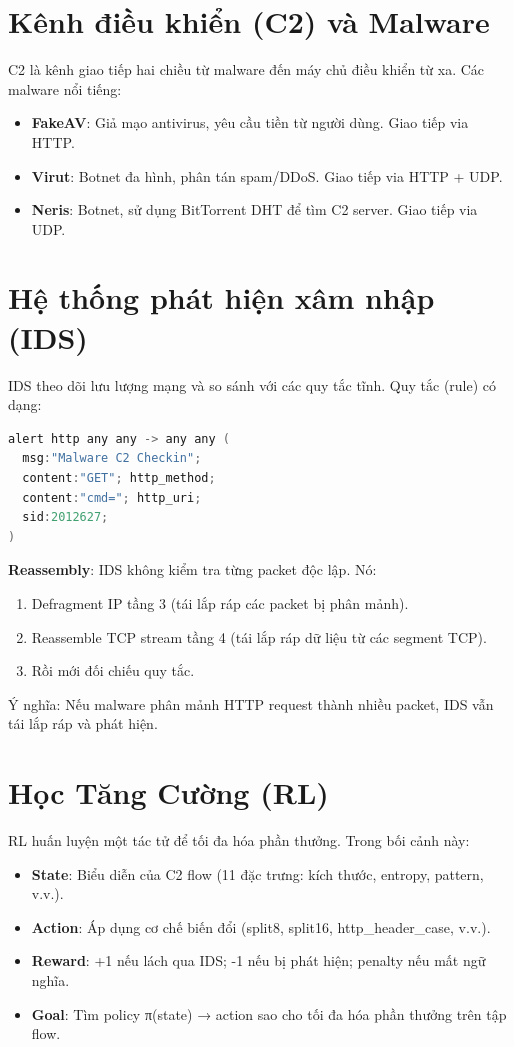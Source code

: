 \documentclass[12pt, a4paper, openany]{book}
\begin{document}
\section{Kênh điều khiển (C2) và Malware}

C2 là kênh giao tiếp hai chiều từ malware đến máy chủ điều khiển từ xa. Các malware nổi tiếng:
\begin{itemize}
    \item \textbf{FakeAV}: Giả mạo antivirus, yêu cầu tiền từ người dùng. Giao tiếp via HTTP.
    \item \textbf{Virut}: Botnet đa hình, phân tán spam/DDoS. Giao tiếp via HTTP + UDP.
    \item \textbf{Neris}: Botnet, sử dụng BitTorrent DHT để tìm C2 server. Giao tiếp via UDP.
\end{itemize}

\section{Hệ thống phát hiện xâm nhập (IDS)}

IDS theo dõi lưu lượng mạng và so sánh với các quy tắc tĩnh. Quy tắc (rule) có dạng:

\begin{lstlisting}[language=C, basicstyle=\ttfamily\small]
alert http any any -> any any (
  msg:"Malware C2 Checkin";
  content:"GET"; http_method;
  content:"cmd="; http_uri;
  sid:2012627;
)
\end{lstlisting}

\textbf{Reassembly}: IDS không kiểm tra từng packet độc lập. Nó:
\begin{enumerate}
    \item Defragment IP tầng 3 (tái lắp ráp các packet bị phân mảnh).
    \item Reassemble TCP stream tầng 4 (tái lắp ráp dữ liệu từ các segment TCP).
    \item Rồi mới đối chiếu quy tắc.
\end{enumerate}

Ý nghĩa: Nếu malware phân mảnh HTTP request thành nhiều packet, IDS vẫn tái lắp ráp và phát hiện.

\section{Học Tăng Cường (RL)}

RL huấn luyện một tác tử để tối đa hóa phần thưởng. Trong bối cảnh này:
\begin{itemize}
    \item \textbf{State}: Biểu diễn của C2 flow (11 đặc trưng: kích thước, entropy, pattern, v.v.).
    \item \textbf{Action}: Áp dụng cơ chế biến đổi (split8, split16, http\_header\_case, v.v.).
    \item \textbf{Reward}: +1 nếu lách qua IDS; -1 nếu bị phát hiện; penalty nếu mất ngữ nghĩa.
    \item \textbf{Goal}: Tìm policy π(state) → action sao cho tối đa hóa phần thưởng trên tập flow.
\end{itemize}
\end{document}
